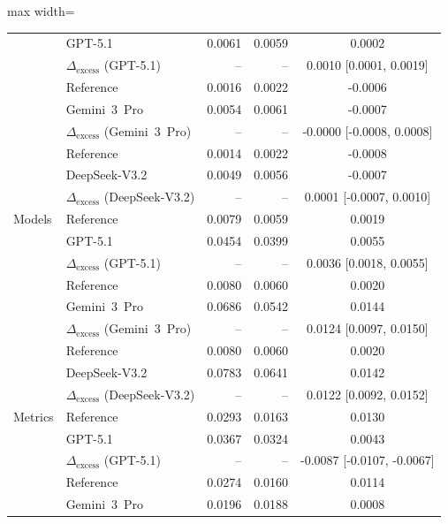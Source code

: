 \begin{table}[H]
\begin{adjustbox}{max width=\textwidth}
\begin{tabular}{llrrrr}
 & GPT-5.1 & 0.0061 & 0.0059 & \multicolumn{2}{c}{0.0002} \\
 & $\Delta_{\mathrm{excess}}$ (GPT-5.1) & -- & -- & \multicolumn{2}{c}{0.0010 [0.0001, 0.0019]} \\
\addlinespace
 & Reference & 0.0016 & 0.0022 & \multicolumn{2}{c}{-0.0006} \\
 & Gemini~3~Pro & 0.0054 & 0.0061 & \multicolumn{2}{c}{-0.0007} \\
 & $\Delta_{\mathrm{excess}}$ (Gemini~3~Pro) & -- & -- & \multicolumn{2}{c}{-0.0000 [-0.0008, 0.0008]} \\
\addlinespace
 & Reference & 0.0014 & 0.0022 & \multicolumn{2}{c}{-0.0008} \\
 & DeepSeek-V3.2 & 0.0049 & 0.0056 & \multicolumn{2}{c}{-0.0007} \\
 & $\Delta_{\mathrm{excess}}$ (DeepSeek-V3.2) & -- & -- & \multicolumn{2}{c}{0.0001 [-0.0007, 0.0010]} \\
\addlinespace
Models & Reference & 0.0079 & 0.0059 & \multicolumn{2}{c}{0.0019} \\
 & GPT-5.1 & 0.0454 & 0.0399 & \multicolumn{2}{c}{0.0055} \\
 & $\Delta_{\mathrm{excess}}$ (GPT-5.1) & -- & -- & \multicolumn{2}{c}{0.0036 [0.0018, 0.0055]} \\
\addlinespace
 & Reference & 0.0080 & 0.0060 & \multicolumn{2}{c}{0.0020} \\
 & Gemini~3~Pro & 0.0686 & 0.0542 & \multicolumn{2}{c}{0.0144} \\
 & $\Delta_{\mathrm{excess}}$ (Gemini~3~Pro) & -- & -- & \multicolumn{2}{c}{0.0124 [0.0097, 0.0150]} \\
\addlinespace
 & Reference & 0.0080 & 0.0060 & \multicolumn{2}{c}{0.0020} \\
 & DeepSeek-V3.2 & 0.0783 & 0.0641 & \multicolumn{2}{c}{0.0142} \\
 & $\Delta_{\mathrm{excess}}$ (DeepSeek-V3.2) & -- & -- & \multicolumn{2}{c}{0.0122 [0.0092, 0.0152]} \\
\addlinespace
Metrics & Reference & 0.0293 & 0.0163 & \multicolumn{2}{c}{0.0130} \\
 & GPT-5.1 & 0.0367 & 0.0324 & \multicolumn{2}{c}{0.0043} \\
 & $\Delta_{\mathrm{excess}}$ (GPT-5.1) & -- & -- & \multicolumn{2}{c}{-0.0087 [-0.0107, -0.0067]} \\
\addlinespace
 & Reference & 0.0274 & 0.0160 & \multicolumn{2}{c}{0.0114} \\
 & Gemini~3~Pro & 0.0196 & 0.0188 & \multicolumn{2}{c}{0.0008} \\

\end{tabular}
\end{adjustbox}
\end{table}
